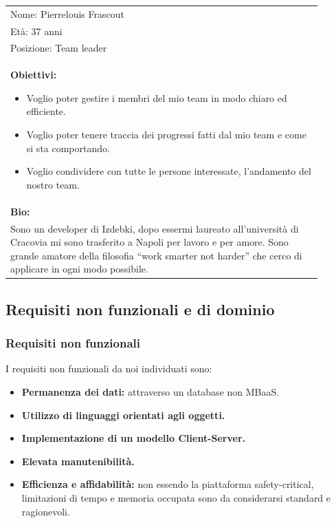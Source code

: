 \documentclass[a4paper, 11pt]{article}
\begin{document}
\begin{table}[H]
    \centering
    \begin{tabular}{|p{0.9\linewidth}|}
        \hline
        Nome: Pierrelouis Frascout \\
        Età: 37 anni \\
        Posizione: Team leader \\
        \hline
        \begin{minipage}[t]{\linewidth}
            \textbf{Obiettivi:}
            \begin{itemize}
                \item Voglio poter gestire i membri del mio team in modo chiaro ed efficiente.
                \item Voglio poter tenere traccia dei progressi fatti dal mio team e come si sta comportando. 
                \item Voglio condividere con tutte le persone interessate, l'andamento del nostro team.
            \end{itemize}
        \end{minipage} \\
        \hline
        \textbf{Bio:} \\
        Sono un developer di Izdebki, dopo essermi laureato all’università di Cracovia mi sono trasferito a Napoli per lavoro e per amore. Sono grande amatore della filosofia “work smarter not harder” che cerco di applicare in ogni modo possibile. \\      
        \hline
    \end{tabular}
\end{table}


\newpage
\subsection{Requisiti non funzionali e di dominio}
\subsubsection{Requisiti non funzionali}
    I requisiti non funzionali da noi individuati sono: 
    \begin{itemize}
        \item \textbf{Permanenza dei dati:} attraverso un database non MBaaS.
        \item \textbf{Utilizzo di linguaggi orientati agli oggetti.}
        \item \textbf{Implementazione di un modello Client-Server.}
        \item \textbf{Elevata manutenibilità.}
        \item \textbf{Efficienza e affidabilità:} non essendo la piattaforma safety-critical, limitazioni di tempo e memoria occupata sono da considerarsi standard e ragionevoli.
    \end{itemize}
\end{document}
